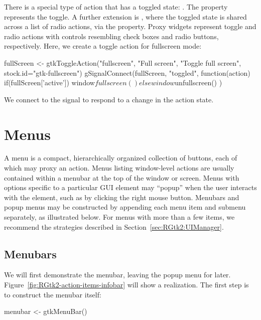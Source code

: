 There is a special type of action that has a toggled state:
. The  property represents the
toggle. A further extension is , where the
toggled state is shared across a list of radio actions, via the
 property. Proxy widgets represent toggle and radio
actions with controls resembling check boxes and radio buttons,
respectively. Here, we create a toggle action for fullscreen mode:
\begin{Schunk}
\begin{Sinput}
 fullScreen <- gtkToggleAction("fullscreen", "Full screen", 
                               "Toggle full screen",
                               stock.id="gtk-fullscreen")
 gSignalConnect(fullScreen, "toggled", function(action) {
   if(fullScreen['active'])
     window$fullscreen()
   else
     window$unfullscreen()
 })
\end{Sinput}
\end{Schunk}
%
We connect to the  signal to respond to a change in the
action state.


\section{Menus}
\label{sec:RGtk2:menus}

A menu is a compact, hierarchically organized collection of buttons,
each of which may proxy an action. Menus listing window-level actions
are usually contained within a menubar at the top of the window or
screen. Menus with options specific to a particular GUI element may
``popup'' when the user interacts with the element, such as by
clicking the right mouse button. Menubars and popup menus may be
constructed by appending each menu item and submenu separately, as
illustrated below. For menus with more than a few items, we recommend
the strategies described in Section~\ref{sec:RGtk2:UIManager}.

\subsection{Menubars}

We will first demonstrate the menubar, leaving the popup menu for
later. Figure~\ref{fig:RGtk2-action-items-infobar} will show a
realization. The first step is to construct the menubar itself:
\begin{Schunk}
\begin{Sinput}
 menubar <- gtkMenuBar()
\end{Sinput}
\end{Schunk}


